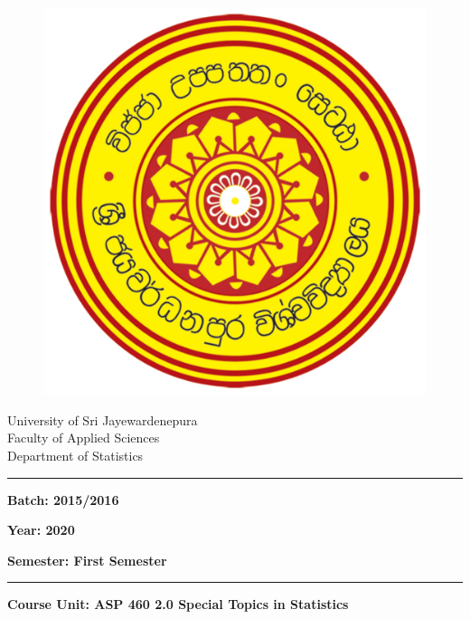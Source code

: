 \documentclass[a4paper,12pt]{article}
\begin{document}
\begin{figure}[ht]
	\begin{center}
		\includegraphics[angle=0,scale=0.05]{SJPLogo.jpg}
	\end{center}
\end{figure}

\vspace{-1cm}

\begin{center}
	University of Sri Jayewardenepura\\
	Faculty of Applied Sciences \\
	Department of Statistics
\end{center}


\noindent\rule{17cm}{0.4pt} 	%

\begin{multicols}{3}
	\noindent\textbf{Batch: 2015/2016}
	
	\columnbreak
	\noindent\textbf{Year: 2020 }
	
	\columnbreak
	\noindent\textbf{Semester: First Semester}
	
\end{multicols}

\noindent\rule{17cm}{0.4pt}	%

\vspace{0.5cm}
\noindent\textbf{Course Unit: ASP 460 2.0 Special Topics in Statistics}\\
\end{document}
